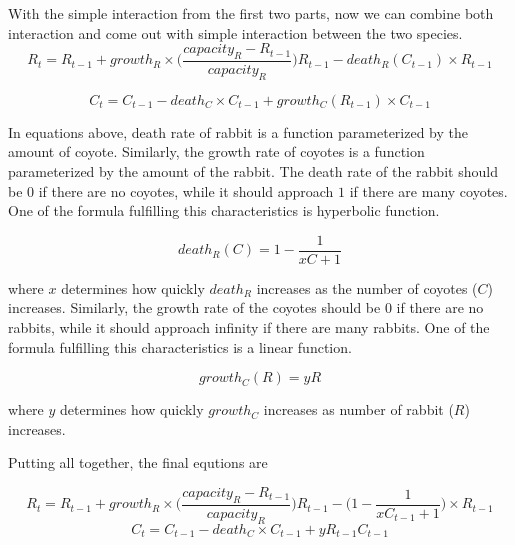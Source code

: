 \documentclass{article}
\begin{document}
\begin{normalsize}
		With the simple interaction from the first two parts, now we can combine both interaction and come out with simple interaction between the two species.
		\begin{equation}
		R_t = R_{t-1} + growth_{R} \times \big( \frac{capacity_{R} - R_{t-1}}{capacity_{R}} \big) R_{t-1} - death_{R}(C_{t-1})\times R_{t-1}
		\end{equation}
		
		\begin{equation}
		C_t = C_{t-1} - death_{C} \times C_{t-1} + growth_{C}(R_{t-1}) \times C_{t-1}
		\end{equation}
		
		In equations above, death rate of rabbit is a function parameterized by the amount of coyote. Similarly, the growth rate of coyotes is a function parameterized by the amount of the rabbit. The death rate of the rabbit should be $0$ if there are no coyotes, while it should approach $1$ if there are many coyotes. One of the formula fulfilling this characteristics is hyperbolic function.
	
		\begin{equation}
		death_R(C) = 1 - \frac{1}{xC + 1}
		\end{equation}
	
		where $x$ determines how quickly $death_R$ increases as the number of coyotes ($C$) increases. Similarly, the growth rate of the coyotes should be $0$ if there are no rabbits, while it should approach infinity if there are many rabbits. One of the formula fulfilling this characteristics is a linear function.
	
		\begin{equation}
		growth_C(R) = yR
		\end{equation}
	
		
		where $y$ determines how quickly $growth_C$ increases as number of rabbit ($R$) increases.
		
		Putting all together, the final equtions are
		
		
		\begin{equation}
		R_t = R_{t-1} + growth_{R} \times \big( \frac{capacity_{R} - R_{t-1}}{capacity_{R}} \big) R_{t-1} - \big( 1 - \frac{1}{xC_{t-1} + 1} \big)\times R_{t-1}
		\end{equation}
		\begin{equation}
		C_t = C_{t-1} - death_{C} \times C_{t-1} + yR_{t-1}C_{t-1}
		\end{equation}
		

\end{normalsize}
\end{document}
